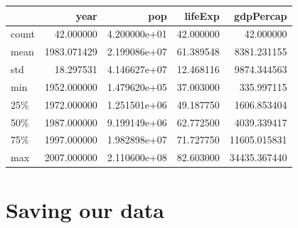 \documentclass[
  letterpaper,
  DIV=11,
  numbers=noendperiod]{scrreprt}
\begin{document}
\begin{tcolorbox}
\begin{tabular}{lrrrr}
\toprule
{} &         year &           pop &    lifeExp &     gdpPercap \\
\midrule
count &    42.000000 &  4.200000e+01 &  42.000000 &     42.000000 \\
mean  &  1983.071429 &  2.199086e+07 &  61.389548 &   8381.231155 \\
std   &    18.297531 &  4.146627e+07 &  12.468116 &   9874.344563 \\
min   &  1952.000000 &  1.479620e+05 &  37.003000 &    335.997115 \\
25\%   &  1972.000000 &  1.251501e+06 &  49.187750 &   1606.853404 \\
50\%   &  1987.000000 &  9.199149e+06 &  62.772500 &   4039.339417 \\
75\%   &  1997.000000 &  1.982898e+07 &  71.727750 &  11605.015831 \\
max   &  2007.000000 &  2.110600e+08 &  82.603000 &  34435.367440 \\
\bottomrule
\end{tabular}

\end{tcolorbox}

\hypertarget{saving-our-data}{%
\section{Saving our data}\label{saving-our-data}}
\end{document}
